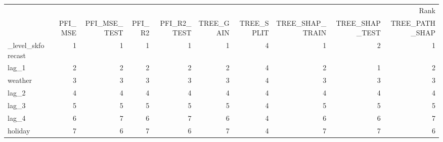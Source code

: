 \begin{tabular}{lrrrrrrrrr}
\toprule
 & \multicolumn{9}{r}{Rank} \\
 & PFI_MSE & PFI_MSE_TEST & PFI_R2 & PFI_R2_TEST & TREE_GAIN & TREE_SPLIT & TREE_SHAP_TRAIN & TREE_SHAP_TEST & TREE_PATH_SHAP \\
\midrule
_level_skforecast & 1 & 1 & 1 & 1 & 1 & 4 & 1 & 2 & 1 \\
lag_1 & 2 & 2 & 2 & 2 & 2 & 4 & 2 & 1 & 2 \\
weather & 3 & 3 & 3 & 3 & 3 & 4 & 3 & 3 & 3 \\
lag_2 & 4 & 4 & 4 & 4 & 4 & 4 & 4 & 4 & 4 \\
lag_3 & 5 & 5 & 5 & 5 & 5 & 4 & 5 & 5 & 5 \\
lag_4 & 6 & 7 & 6 & 7 & 6 & 4 & 6 & 6 & 7 \\
holiday & 7 & 6 & 7 & 6 & 7 & 4 & 7 & 7 & 6 \\
\bottomrule
\end{tabular}
